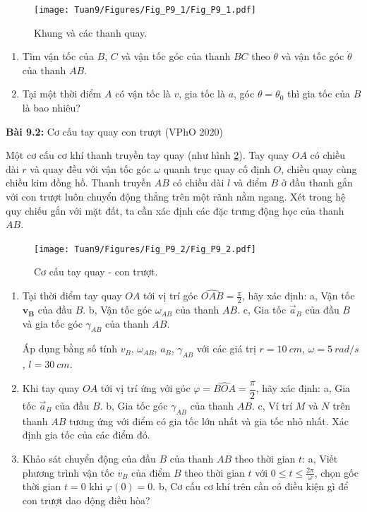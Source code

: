 \begin{figure}[!h]
    \centering
    \texttt{[image: Tuan9/Figures/Fig\_P9\_1/Fig\_P9\_1.pdf]}
    \caption{Khung và các thanh quay.}
    \label{fig:9_P1}
\end{figure}

\begin{enumerate}
    \item Tìm vận tốc của \(B\), \(C\) và vận tốc góc của thanh \(BC\) theo \(\theta\) và vận tốc góc \(\dot{\theta}\) của thanh \(AB\).
    \item Tại một thời điểm \(A\) có vận tốc là \(v\), gia tốc là \(a\), góc \(\theta=\theta_0\) thì gia tốc của \(B\) là bao nhiêu?
\end{enumerate}

\textbf{Bài 9.2:} Cơ cấu tay quay con trượt (VPhO 2020)

Một cơ cấu cơ khí thanh truyền tay quay (như hình \ref{fig:9_P2}). 
Tay quay \(OA\) có chiều dài \(r\) và quay đều với vận tốc góc \(\omega\) quanh trục quay cố định \(O\), chiều quay cùng chiều kim đồng hồ. 
Thanh truyền \(AB\) có chiều dài \(l\) và điểm \(B\) ở đầu thanh gắn với con trượt luôn chuyển động thẳng trên một rãnh nằm ngang. 
Xét trong hệ quy chiếu gắn với mặt đất, ta cần xác định các đặc trưng động học của thanh \(AB\).

\begin{figure}[!h]
    \centering
    \texttt{[image: Tuan9/Figures/Fig\_P9\_2/Fig\_P9\_2.pdf]}
    \caption{Cơ cấu tay quay - con trượt.}
    \label{fig:9_P2}
\end{figure}

\begin{enumerate}
	\item Tại thời điểm tay quay \(OA\) tới vị trí góc \(\widehat{OAB}= \frac{\pi}{2}\), hãy xác định:
        \subitem a, Vận tốc \(\mathbf{v_B}\) của đầu \(B\).
        \subitem b, Vận tốc góc \(\omega_{AB}\) của thanh \(AB\).
        \subitem c, Gia tốc \(\vec{a}_B\) của đầu \(B\) và gia tốc góc \(\gamma_{AB}\) của thanh \(AB\).
        
Áp dụng bằng số tính \(v_B\), \(\omega_{AB}\), \(a_B\), \(\gamma_{AB}\) với các giá trị \(r = \SI{10}{cm}\), \(\omega = \SI{5}{rad/s}\), \(l = \SI{30}{cm}\).
    \item Khi tay quay \(OA\) tới vị trí ứng với góc \(\varphi = \widehat{BOA} = \dfrac{\pi}{2}\), hãy xác định: 
        \subitem a, Gia tốc \(\vec{a}_B\) của đầu \(B\).
        \subitem b, Gia tốc góc \(\gamma_{AB}\) của thanh \(AB\).
        \subitem c, Ví trí \(M\) và \(N\) trên thanh \(AB\) tương ứng với điểm có gia tốc lớn nhất và gia tốc nhỏ nhất. Xác định gia tốc của các điểm đó.
    \item Khảo sát chuyển động của đầu \(B\) của thanh $AB$ theo thời gian \(t\):
        \subitem a, Viết phương trình vận tốc \(v_B\) của điểm $B$ theo thời gian \(t\) với \(0 \le t \le \frac{2 \pi}{\omega}\), chọn gốc thời gian \(t = 0\) khi \(\varphi (0) = 0\).
        \subitem b, Cơ cấu cơ khí trên cần có điều kiện gì để con trượt dao động điều hòa?
\end{enumerate}

